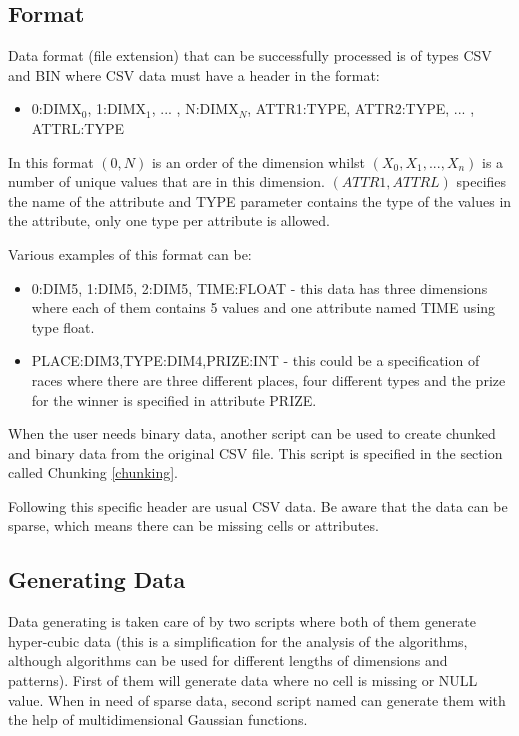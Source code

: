 \subsection{Format}\label{format}
Data format (file extension) that can be successfully processed is of types CSV and BIN where CSV data must have a header in the format:
\begin{itemize}
\item 0:DIMX$_0$, 1:DIMX$_1$, ... , N:DIMX$_N$, ATTR1:TYPE, ATTR2:TYPE, ... , ATTRL:TYPE
\end{itemize}
In this format $(0, N)$ is an order of the dimension whilst $(X_0, X_1, ... , X_n)$ is a number of unique values that are in this dimension. $(ATTR1, ATTRL)$ specifies the name of the attribute and TYPE parameter contains the type of the values in the attribute, only one type per attribute is allowed. 

Various examples of this format can be: 
\begin{itemize}
\item 0:DIM5, 1:DIM5, 2:DIM5, TIME:FLOAT - this data has three dimensions where each of them contains 5 values and one attribute named TIME using type float.
\item PLACE:DIM3,TYPE:DIM4,PRIZE:INT - this could be a specification of races where there are three different places, four different types and the prize for the winner is specified in attribute PRIZE.
\end{itemize}

When the user needs binary data, another script can be used to create chunked and binary data from the original CSV file. This script is specified in the section called Chunking \ref{chunking}.

Following this specific header are usual CSV data. Be aware that the data can be sparse, which means there can be missing cells or attributes.

\subsection{Generating Data}\label{generating}
Data generating is taken care of by two scripts where both of them generate hyper-cubic data (this is a simplification for the analysis of the algorithms, although algorithms can be used for different lengths of dimensions and patterns). First of them will generate data where no cell is missing or NULL value.
When in need of sparse data, second script named can generate them with the help of multidimensional Gaussian functions. 

